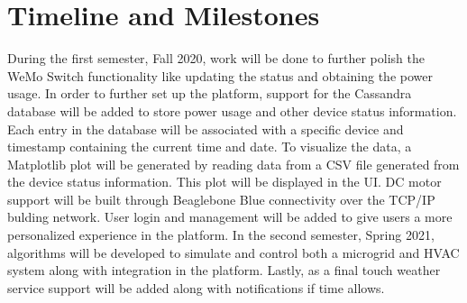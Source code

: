 \documentclass[letterpaper,12pt]{article}   %
\begin{document}
\section{Timeline and Milestones} \label{sec:timeline}
During the first semester, Fall 2020, work will be done to further polish the WeMo Switch functionality like updating the status and obtaining the power usage. In order to further set up the platform, support for the Cassandra database will be added to store power usage and other device status information. Each entry in the database will be associated with a specific device and timestamp containing the current time and date. To visualize the data, a Matplotlib plot will be generated by reading data from a CSV file generated from the device status information. This plot will be displayed in the UI. DC motor support will be built through Beaglebone Blue connectivity over the TCP/IP bulding network. User login and management will be added to give users a more personalized experience in the platform. In the second semester, Spring 2021, algorithms will be developed to simulate and control both a microgrid and HVAC system along with integration in the platform. Lastly, as a final touch weather service support will be added along with notifications if time allows.
\end{document}
